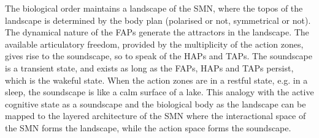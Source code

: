 The biological order maintains a landscape of the SMN, where the topos of the landscape is determined by the body plan (polarised or not, symmetrical or not). The dynamical nature of the FAPs generate the attractors in the landscape. The available articulatory freedom, provided by the multiplicity of the action zones, gives rise to the soundscape, so to speak of the HAPs and TAPs. The soundscape is a transient state, and exists as long as the FAPs, HAPs and TAPs persist, which is the wakeful state. When the action zones are in a restful state, e.g. in a sleep, the soundscape is like a calm surface of a lake. This analogy with the active cognitive state as a soundscape and the biological body as the landscape can be mapped to the layered architecture of the SMN where the interactional space of the SMN forms the landscape, while the action space forms the soundscape.


